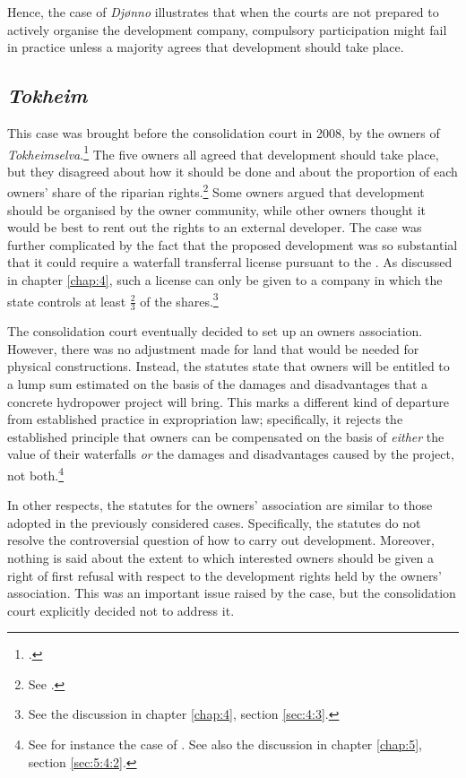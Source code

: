 Hence, the case of {\it Djønno} illustrates that when the courts are not prepared to actively organise the development company, compulsory participation might fail in practice unless a majority agrees that development should take place.

\subsection{\emph{Tokheim}}\label{sec:6:4:4}

This case was brought before the consolidation court in 2008, by the owners of \emph{Tokheimselva}.\footcite{tokheim08} The five owners all agreed that development should take place, but they disagreed about how it should be done and about the proportion of each owners' share of the riparian rights.\footnote{See \cite[34-36]{stokstad11}.} Some owners argued that development should be organised by the owner community, while other owners thought it would be best to rent out the rights to an external developer. The case was further complicated by the fact that the proposed development was so substantial that it could require a waterfall transferral license pursuant to the \cite{ica17}. As discussed in chapter \ref{chap:4}, such a license can only be given to a company in which the state controls at least $\frac{2}{3}$ of the shares.\footnote{See the discussion in chapter \ref{chap:4}, section \ref{sec:4:3}.}

The consolidation court eventually decided to set up an owners association. However, there was no adjustment made for land that would be needed for physical constructions. Instead, the statutes state that owners will be entitled to a lump sum estimated on the basis of the damages and disadvantages that a concrete hydropower project will bring. This marks a different kind of departure from established practice in expropriation law; specifically, it rejects the established principle that owners can be compensated on the basis of \emph{either} the value of their waterfalls \emph{or} the damages and disadvantages caused by the project, not both.\footnote{See for instance the case of \cite{vikfalli71}. See also the discussion in chapter \ref{chap:5}, section \ref{sec:5:4:2}.}

In other respects, the statutes for the owners' association are similar to those adopted in the previously considered cases. Specifically, the statutes do not resolve the controversial question of how to carry out development. Moreover, nothing is said about the extent to which interested owners should be given a right of first refusal with respect to the development rights held by the owners' association. This was an important issue raised by the case, but the consolidation court explicitly decided not to address it. %

